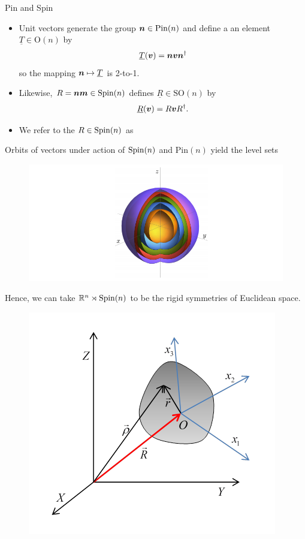 \documentclass[aspectratio=169]{beamer}
\begin{document}
\begin{frame}{Pin and Spin}
\vfill
\begin{itemize}
	\item Unit vectors generate the group $\boldsymbol{n}\in \mathrm{Pin}(n)$ and define a an element $\underline{T}\in \mathrm{O}(n)$ by
	\[
	\underline{T}(\boldsymbol{v}) = \boldsymbol{n} \boldsymbol{v} \boldsymbol{n}^\dagger
	\]
	so the mapping $\boldsymbol{n}\mapsto \underline{T}$ is 2-to-1.
	\item Likewise, $R=\boldsymbol{nm} \in \mathrm{Spin}(n)$ defines $\underline{R} \in \mathrm{SO}(n)$ by
	\[
	\underline{R}(\boldsymbol{v}) = R\boldsymbol{v}R^\dagger.
	\]
	\item We refer to the $R\in \mathrm{Spin}(n)$ as 
\end{itemize}
\vfill
\end{frame}

\begin{frame}{}
\vfill
\centering Orbits of vectors under action of $\mathrm{Spin}(n)$ and $\mathrm{Pin}(n)$ yield the level sets
\begin{figure}[H]
\centering
\includegraphics[width=.8\textwidth]{figures/euclidean.png}
\end{figure}
\end{frame}

\begin{frame}{}
\vfill
\centering Hence, we can take $\mathbb{R}^n \rtimes \mathrm{Spin}(n)$ to be the rigid symmetries of Euclidean space.
\begin{figure}[H]
\centering
\includegraphics[width=.5\textwidth]{figures/rigid_body.png}
\end{figure} 
\vfill
\end{frame}
\end{document}
